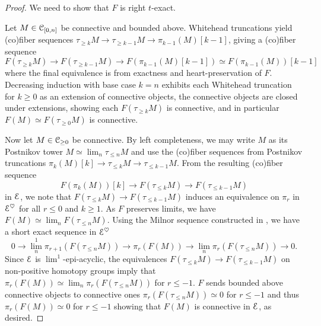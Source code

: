 \begin{proof}
    We need to show that $F$ is right $t$-exact. 

    Let $M\in\EuScript{C}_{[0,n]}$ be connective and bounded above. Whitehead truncations yield (co)fiber sequences $\tau_{\geq k}M\to\tau_{\geq k-1}M\to\pi_{k-1}(M)[k-1]$, giving a (co)fiber sequence 
    $$F(\tau_{\geq k}M)\to F(\tau_{\geq k-1}M)\to F(\pi_{k-1}(M)[k-1])\simeq F(\pi_{k-1}(M))[k-1]$$
    where the final equivalence is from exactness and heart-preservation of $F$. Decreasing induction with base case $k=n$ exhibits each Whitehead truncation for $k\geq0$ as an extension of connective objects, the connective objects are closed under extensions, showing each $F(\tau_{\geq k}M)$ is connective, and in particular $F(M)\simeq F(\tau_{\geq0}M)$ is connective. 

    Now let $M\in\EuScript{C}_{\geq0}$ be connective. By left completeness, we may write $M$ as its Postnikov tower $M\simeq\lim_{n}\tau_{\leq n}M$ and use the (co)fiber sequences from Postnikov truncations $\pi_{k}(M)[k]\to\tau_{\leq k}M\to\tau_{\leq k-1}M$. From the resulting (co)fiber sequence 
    $$F(\pi_{k}(M))[k]\to F(\tau_{\leq k}M)\to F(\tau_{\leq k-1}M)$$
    in $\EuScript{E}$, we note that $F(\tau_{\leq k}M)\to F(\tau_{\leq k-1}M)$ induces an equivalence on $\pi_{r}$ in $\EuScript{E}^{\heartsuit}$ for all $r\leq0$ and $k\geq 1$. As $F$ preserves limits, we have $F(M)\simeq\lim_{n}F(\tau_{\leq n}M)$. Using the Milnor sequence constructed in , we have a short exact sequence in $\EuScript{E}^{\heartsuit}$
    $$0\to\lim^{1}_{n}\pi_{r+1}(F(\tau_{\leq n}M))\to\pi_{r}(F(M))\to\lim_{n}\pi_{r}(F(\tau_{\leq n}M))\to0.$$
    Since $\EuScript{E}$ is $\lim^{1}$-epi-acyclic, the equivalences $F(\tau_{\leq k}M)\to F(\tau_{\leq k-1}M)$ on non-positive homotopy groups imply that $\pi_{r}(F(M))\simeq\lim_{n}\pi_{r}(F(\tau_{\leq n}M))$ for $r\leq-1$. $F$ sends bounded above connective objects to connective ones $\pi_{r}(F(\tau_{\leq n}M))\simeq0$ for $r\leq -1$ and thus $\pi_{r}(F(M))\simeq0$ for $r\leq -1$ showing that $F(M)$ is connective in $\EuScript{E}$, as desired. 
\end{proof}
